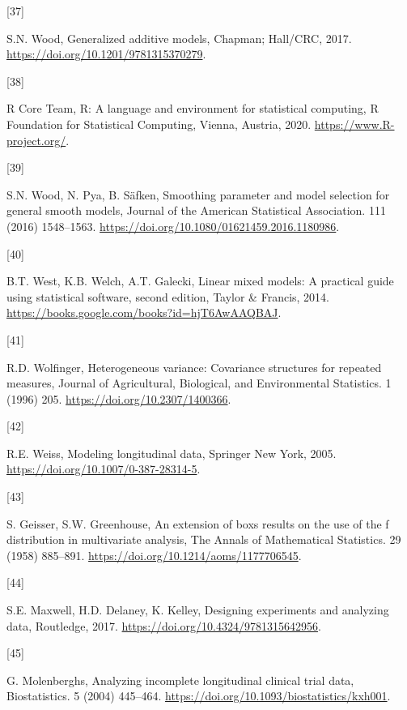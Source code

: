 \documentclass[
]{article}
\newlength{\cslhangindent}
\newlength{\csllabelwidth}
\newlength{\cslentryspacingunit} %
\newenvironment{CSLReferences}[2] %
 {%
  \setlength{\parindent}{0pt}
  \ifodd #1
  \let\oldpar\par
  \def\par{\hangindent=\cslhangindent\oldpar}
  \fi
  \setlength{\parskip}{#2\cslentryspacingunit}
 }%
 {}
\newcommand{\CSLLeftMargin}[1]{\parbox[t]{\csllabelwidth}{#1}}
\newcommand{\CSLRightInline}[1]{\parbox[t]{\linewidth - \csllabelwidth}{#1}\break}
\begin{document}
\begin{CSLReferences}{0}{0}
\leavevmode{}%
\CSLLeftMargin{{[}37{]} }
\CSLRightInline{S.N. Wood, Generalized additive models, Chapman; Hall/{CRC}, 2017. \url{https://doi.org/10.1201/9781315370279}.}

\leavevmode{}%
\CSLLeftMargin{{[}38{]} }
\CSLRightInline{R Core Team, R: A language and environment for statistical computing, R Foundation for Statistical Computing, Vienna, Austria, 2020. \url{https://www.R-project.org/}.}

\leavevmode{}%
\CSLLeftMargin{{[}39{]} }
\CSLRightInline{S.N. Wood, N. Pya, B. Säfken, Smoothing parameter and model selection for general smooth models, Journal of the American Statistical Association. 111 (2016) 1548--1563. \url{https://doi.org/10.1080/01621459.2016.1180986}.}

\leavevmode{}%
\CSLLeftMargin{{[}40{]} }
\CSLRightInline{B.T. West, K.B. Welch, A.T. Galecki, Linear mixed models: A practical guide using statistical software, second edition, Taylor \& Francis, 2014. \url{https://books.google.com/books?id=hjT6AwAAQBAJ}.}

\leavevmode{}%
\CSLLeftMargin{{[}41{]} }
\CSLRightInline{R.D. Wolfinger, Heterogeneous variance: Covariance structures for repeated measures, Journal of Agricultural, Biological, and Environmental Statistics. 1 (1996) 205. \url{https://doi.org/10.2307/1400366}.}

\leavevmode{}%
\CSLLeftMargin{{[}42{]} }
\CSLRightInline{R.E. Weiss, Modeling longitudinal data, Springer New York, 2005. \url{https://doi.org/10.1007/0-387-28314-5}.}

\leavevmode{}%
\CSLLeftMargin{{[}43{]} }
\CSLRightInline{S. Geisser, S.W. Greenhouse, An extension of box{\textquotesingle}s results on the use of the {\textdollar}f{\textdollar} distribution in multivariate analysis, The Annals of Mathematical Statistics. 29 (1958) 885--891. \url{https://doi.org/10.1214/aoms/1177706545}.}

\leavevmode{}%
\CSLLeftMargin{{[}44{]} }
\CSLRightInline{S.E. Maxwell, H.D. Delaney, K. Kelley, Designing experiments and analyzing data, Routledge, 2017. \url{https://doi.org/10.4324/9781315642956}.}

\leavevmode{}%
\CSLLeftMargin{{[}45{]} }
\CSLRightInline{G. Molenberghs, Analyzing incomplete longitudinal clinical trial data, Biostatistics. 5 (2004) 445--464. \url{https://doi.org/10.1093/biostatistics/kxh001}.}


\end{CSLReferences}
\end{document}

